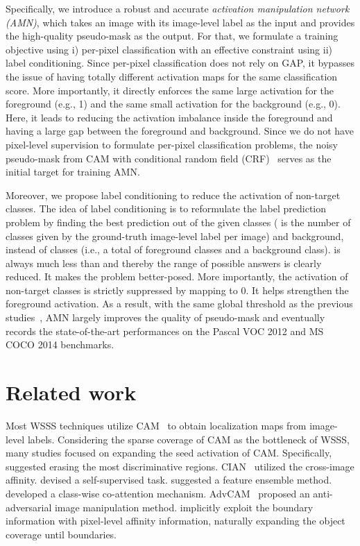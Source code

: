 \documentclass[10pt,twocolumn,letterpaper]{article}
\begin{document}
Specifically, we introduce a robust and accurate \emph{activation manipulation network (AMN)}, which takes an image with its image-level label as the input and provides the high-quality pseudo-mask as the output. For that, we formulate a training objective using i) per-pixel classification with an effective constraint using ii) label conditioning. Since per-pixel classification does not rely on GAP, it bypasses the issue of having totally different activation maps for the same classification score. More importantly, it directly enforces the same large activation for the foreground (e.g., 1) and the same small activation for the background (e.g., 0). Here, it leads to reducing the activation imbalance inside the foreground and having a large gap between the foreground and background. Since we do not have pixel-level supervision to formulate per-pixel classification problems, the noisy pseudo-mask from CAM with conditional random field (CRF)~\cite{krahenbuhl2011efficient} serves as the initial target for training AMN. 

Moreover, we propose label conditioning to reduce the activation of non-target classes. The idea of label conditioning is to reformulate the label prediction problem by finding the best prediction out of the given  classes ( is the number of classes given by the ground-truth image-level label per image) and background, instead of  classes (i.e., a total of  foreground classes and a background class).  is always much less than  and thereby the range of possible answers is clearly reduced. It makes the problem better-posed. More importantly, the activation of non-target classes is strictly suppressed by mapping to 0. It helps strengthen the foreground activation. As a result, with the same global threshold as the previous studies~\cite{ahn2019weakly, lee2021anti, lee2021reducing}, AMN largely improves the quality of pseudo-mask and eventually records the state-of-the-art performances on the Pascal VOC 2012 and MS COCO 2014 benchmarks.
 \section{Related work}
\label{sec:related}

Most WSSS techniques utilize CAM~\cite{zhou2016learning} to obtain localization maps from image-level labels. Considering the sparse coverage of CAM as the bottleneck of WSSS, many studies focused on expanding the seed activation of CAM. Specifically, \cite{li2018tell,hou2018self,choe2020attention} suggested erasing the most discriminative regions. CIAN~\cite{fan2020cian} utilized the cross-image affinity. \cite{chang2020weakly,wang2020self} devised a self-supervised task. \cite{lee2019ficklenet, jiang2019integral} suggested a feature ensemble method. \cite{LiZLZZ21Group,sun2020mining} developed a class-wise co-attention mechanism. AdvCAM~\cite{lee2021anti} proposed an anti-adversarial image manipulation method. \cite{ahn2018learning,ahn2019weakly} implicitly exploit the boundary information with pixel-level affinity information, naturally expanding the object coverage until boundaries. 
\end{document}
